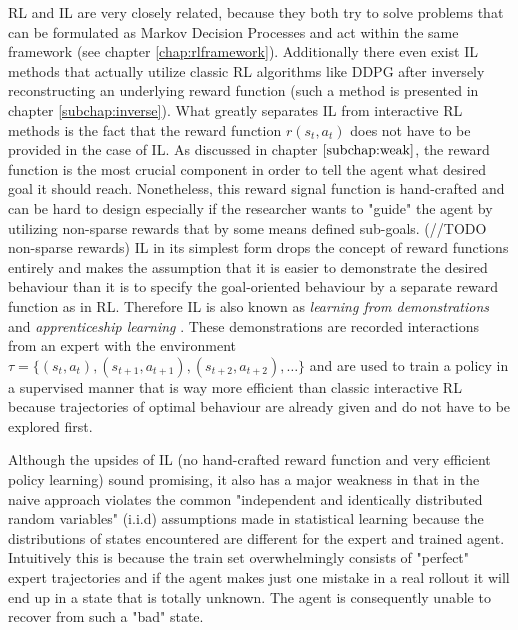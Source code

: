 \par
RL and IL are very closely related, because they both try to solve problems that can be formulated as Markov Decision Processes and act within the same framework (see chapter \ref{chap:rlframework}). Additionally there even exist IL methods that actually utilize classic RL algorithms like DDPG after inversely reconstructing an underlying reward function (such a method is presented in chapter \ref{subchap:inverse}). What greatly separates IL from interactive RL methods is the fact that the reward function $r(s_t, a_t)$ does not have to be provided in the case of IL. As discussed in chapter $\ref{subchap:weak}$, the reward function is the most crucial component in order to tell the agent what desired goal it should reach. Nonetheless, this reward signal function is hand-crafted and can be hard to design especially if the researcher wants to "guide" the agent by utilizing non-sparse rewards that by some means defined sub-goals. (//TODO non-sparse rewards) IL in its simplest form drops the concept of reward functions entirely and makes the assumption that it is easier to demonstrate the desired behaviour than it is to specify the goal-oriented behaviour by a separate reward function as in RL. Therefore IL is also known as \textit{learning from demonstrations} and \textit{apprenticeship learning} \cite[p.~470]{Sutton1998}. These demonstrations are recorded interactions from an expert with the environment $\tau = \{(s_t, a_t), (s_{t+1}, a_{t+1}), (s_{t+2}, a_{t+2}), \dots\}$ and are used to train a policy in a supervised manner that is way more efficient than classic interactive RL because trajectories of optimal behaviour are already given and do not have to be explored first.
\par
Although the upsides of IL (no hand-crafted reward function and very efficient policy learning) sound promising, it also has a major weakness in that in the naive approach violates the common "independent and identically distributed random variables" (i.i.d) assumptions made in statistical learning \cite{ross2011reduction} because the distributions of states encountered are different for the expert and trained agent. Intuitively this is because the train set overwhelmingly consists of "perfect" expert trajectories and if the agent makes just one mistake in a real rollout it will end up in a state that is totally unknown. The agent is consequently unable to recover from such a "bad" state.


